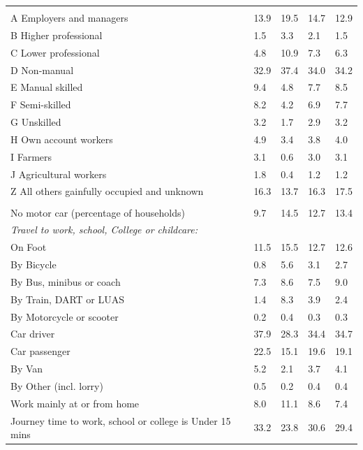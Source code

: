 \documentclass{article}
\begin{document}
\begin{table}[h]
\begin{tabular}{KTTTT}
\hline
    \\ 
    \hline
A Employers and managers & 13.9& 19.5& 14.7& 12.9\\
B Higher professional & 1.5& 3.3& 2.1& 1.5\\
C Lower professional &  4.8& 10.9&  7.3&  6.3\\
D Non-manual & 32.9& 37.4& 34.0& 34.2\\
E Manual skilled & 9.4& 4.8& 7.7& 8.5\\
F Semi-skilled & 8.2& 4.2& 6.9& 7.7\\
G Unskilled & 3.2& 1.7& 2.9& 3.2\\
H Own account workers & 4.9& 3.4& 3.8& 4.0\\
I Farmers & 3.1& 0.6& 3.0& 3.1\\
J Agricultural workers & 1.8& 0.4& 1.2& 1.2\\
Z All others gainfully occupied and unknown & 16.3& 13.7& 16.3& 17.5\\
\hline
{}\hline
    \\ 
    \hline
No motor car (percentage of households) &  9.7& 14.5& 12.7& 
13.4\\
    \hline 
\emph{Travel to work, school, College or childcare:} & & & \\
\quad On Foot & 11.5& 15.5& 12.7& 12.6\\ 
\quad By Bicycle & 0.8& 5.6& 3.1& 2.7\\ 
\quad By Bus, minibus or coach & 7.3& 8.6& 7.5& 9.0\\
\quad By Train, DART or LUAS & 1.4& 8.3& 3.9& 2.4\\
\quad By Motorcycle or scooter & 0.2& 0.4& 0.3& 0.3\\
\quad Car driver & 37.9 & 28.3& 34.4& 34.7\\
\quad Car passenger & 22.5& 15.1& 19.6& 19.1\\
\quad By Van & 5.2& 2.1& 3.7& 4.1\\
\quad By Other (incl. lorry) & 0.5& 0.2& 0.4& 0.4\\
    \hline
Work mainly at or from home &  8.0& 11.1&  8.6&  7.4\\
Journey time to work, school or college is Under 15 mins & 33.2& 23.8& 30.6& 29.4\\

\end{tabular}
\end{table}
\end{document}
